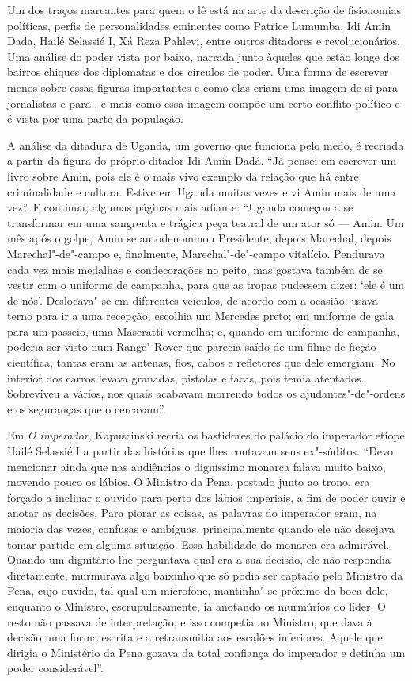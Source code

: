 Um dos traços marcantes para quem o lê está na arte da descrição de
fisionomias políticas, perfis de personalidades eminentes como Patrice
Lumumba, Idi Amin Dada, Hailé Selassié I, Xá Reza Pahlevi, entre outros
ditadores e revolucionários. Uma análise do poder vista por baixo,
narrada junto àqueles que estão longe dos bairros chiques dos diplomatas
e dos círculos de poder. Uma forma de escrever menos sobre essas figuras
importantes e como elas criam uma imagem de si para jornalistas e para
, e mais como essa imagem compõe um certo conflito político e é vista
por uma parte da população.

A análise da ditadura de Uganda, um governo que funciona pelo
medo, é recriada a partir da figura do próprio ditador Idi Amin Dadá.
``Já pensei em escrever um livro sobre Amin, pois ele é o mais vivo
exemplo da relação que há entre criminalidade e cultura. Estive em
Uganda muitas vezes e vi Amin mais de uma vez''. E continua, algumas
páginas mais adiante: ``Uganda começou a se transformar em uma sangrenta
e trágica peça teatral de um ator só --- Amin. Um mês após o golpe, Amin
se autodenominou Presidente, depois Marechal, depois Marechal"-de"-campo
e, finalmente, Marechal"-de"-campo vitalício. Pendurava cada vez mais
medalhas e condecorações no peito, mas gostava também de se vestir com o
uniforme de campanha, para que as tropas pudessem dizer: `ele é um de
nós'. Deslocava"-se em diferentes veículos, de acordo com a ocasião:
usava terno para ir a uma recepção, escolhia um Mercedes preto; em
uniforme de gala para um passeio, uma Maseratti vermelha; e, quando em
uniforme de campanha, poderia ser visto num Range"-Rover que parecia
saído de um filme de ficção científica, tantas eram as antenas, fios,
cabos e refletores que dele emergiam. No interior dos carros levava
granadas, pistolas e facas, pois temia atentados. Sobreviveu a vários,
nos quais acabavam morrendo todos os ajudantes"-de"-ordens e os seguranças
que o cercavam''.

Em \emph{O imperador}, Kapuscinski recria os bastidores do palácio do
imperador etíope Hailé Selassié I a partir das histórias que lhes
contavam seus ex"-súditos. ``Devo mencionar ainda que nas audiências o
digníssimo monarca falava muito baixo, movendo pouco os lábios. O
Ministro da Pena, postado junto ao trono, era forçado a inclinar o
ouvido para perto dos lábios imperiais, a fim de poder ouvir e anotar as
decisões. Para piorar as coisas, as palavras do imperador eram, na
maioria das vezes, confusas e ambíguas, principalmente quando ele não
desejava tomar partido em alguma situação. Essa habilidade do monarca
era admirável. Quando um dignitário lhe perguntava qual era a sua
decisão, ele não respondia diretamente, murmurava algo baixinho que só
podia ser captado pelo Ministro da Pena, cujo ouvido, tal qual um
microfone, mantinha"-se próximo da boca dele, enquanto o Ministro,
escrupulosamente, ia anotando os murmúrios do líder. O resto não passava
de interpretação, e isso competia ao Ministro, que dava à decisão uma
forma escrita e a retransmitia aos escalões inferiores. Aquele que
dirigia o Ministério da Pena gozava da total confiança do imperador e
detinha um poder considerável''.

